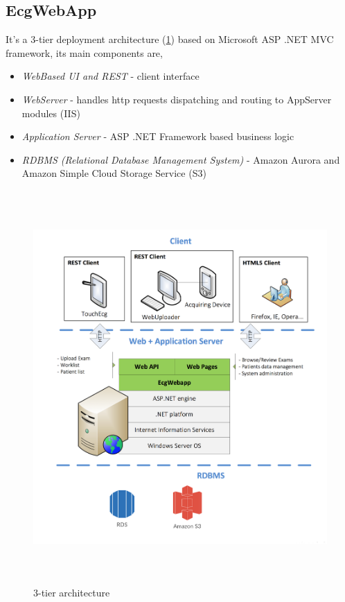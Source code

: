 \subsection{EcgWebApp}
\label{subsection:ecgwebapp}
It's a 3-tier deployment architecture (\ref{fig:tiers_diagram}) based on Microsoft ASP .NET MVC framework, its main components are,
\begin{itemize}
    \item \textit{WebBased UI and REST} - client interface
    \item \textit{WebServer} - handles http requests dispatching and routing to AppServer modules (IIS)
    \item \textit{Application Server} - ASP .NET Framework based business logic
    \item \textit{RDBMS (Relational Database Management System)} - Amazon Aurora and Amazon Simple Cloud Storage Service (S3)
\end{itemize}
\begin{figure}[h]
    \centering
    \includegraphics[width=\textwidth,height=15cm,keepaspectratio]{img/tiers_diagram}
    \caption{3-tier architecture}
    \label{fig:tiers_diagram}
\end{figure}
